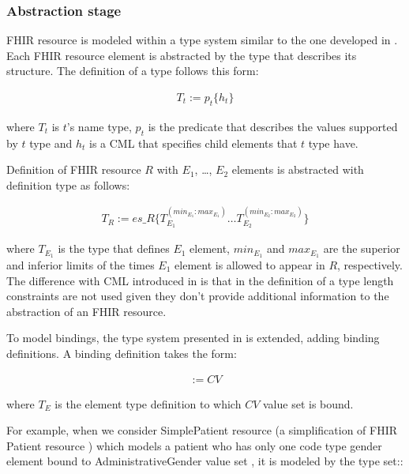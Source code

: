 \subsubsection{Abstraction stage}

FHIR resource is modeled within a type system similar to the one developed in \cite{Maldonado09}. Each FHIR resource element is abstracted by the type that describes its structure. The definition of a type follows this form:

\begin{align*}
T_t:=p_t\{h_t\}
\end{align*}

\noindent
where \(T_t\) is \(t\)'s name type, \(p_t\) is the predicate that describes the values supported by \(t\) type and \(h_t\) is a CML that specifies child elements that \(t\) type have.

Definition of FHIR resource \(R\) with \(E_1\), \dots , \(E_2\) elements is abstracted with definition type as follows:

\begin{align*}
T_R:=es\_R\{T_{E_1}^{(min_{E_1} \colon max_{E_1})} \dots T_{E_2}^{(min_{E_2} \colon max_{E_2})}\}
\end{align*}

\noindent
where \(T_{E_1}\) is the type that defines \(E_1\) element, \(min_{E_1}\) and \(max_{E_1}\) are the superior and inferior limits of the times \(E_1\) element is allowed to appear in \(R\), respectively. The difference with CML introduced in \cite{Maldonado09} is that in the definition of a type length constraints are not used given they don’t provide additional information to the abstraction of an FHIR resource.

To model bindings, the type system presented in \cite{Maldonado09} is extended, adding binding definitions. A binding definition takes the form:

\begin{align*}
[T_E] := CV
\end{align*}

\noindent
where \(T_E\) is the element type definition to which \(CV\) value set is bound.

For example, when we consider SimplePatient resource (a simplification of FHIR Patient resource \cite{FHIRPatient}) which models a patient who has only one code type gender element \cite{FHIRDataTypes} bound to AdministrativeGender value set \cite{FHIRAdministrativeGender}, it is modeled by the type set::

